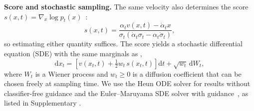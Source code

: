 \noindent\textbf{Score and stochastic sampling.}
The same velocity also determines the score $s(x,t)=\nabla_x\log p_t(x)$~\citep{song2021score,ma2024sit}:
\begin{equation}
s(x,t)=\frac{\alpha_t v(x,t)-\dot\alpha_t x}{\sigma_t\left(\dot\alpha_t\sigma_t-\alpha_t\dot\sigma_t\right)},
\label{eq:score_from_velocity}
\end{equation}
so estimating either quantity suffices. The score yields a stochastic differential equation (SDE) with the same marginals as ,
\begin{equation}
\mathrm{d}x_t=\left[v(x_t,t)+\tfrac{1}{2}w_t\,s(x_t,t)\right]\mathrm{d}t+\sqrt{w_t}\,\mathrm{d}W_t,
\label{eq:sampling_sde}
\end{equation}
where $W_t$ is a Wiener process and $w_t\ge0$ is a diffusion coefficient that can be chosen freely at sampling time. We use the Heun ODE solver for results without classifier-free guidance and the Euler--Maruyama SDE solver with guidance~\citep{ho2022classifier}, as listed in Supplementary .
